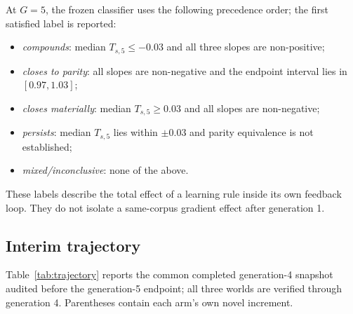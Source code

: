 \documentclass[11pt]{article}
\begin{document}
At $G=5$, the frozen classifier uses the following precedence order; the first satisfied
label is reported:
\begin{itemize}
  \item \emph{compounds}: median $T_{s,5}\leq-0.03$ and all three slopes are non-positive;
  \item \emph{closes to parity}: all slopes are non-negative and the endpoint interval lies
        in $[0.97,1.03]$;
  \item \emph{closes materially}: median $T_{s,5}\geq0.03$ and all slopes are non-negative;
  \item \emph{persists}: median $T_{s,5}$ lies within $\pm0.03$ and parity equivalence is
        not established;
  \item \emph{mixed/inconclusive}: none of the above.
\end{itemize}
These labels describe the total effect of a learning rule inside its own feedback loop.
They do not isolate a same-corpus gradient effect after generation 1.

\subsection{Interim trajectory}
\label{sec:tree-interim}

Table~\ref{tab:trajectory} reports the common completed generation-4 snapshot audited before
the generation-5 endpoint; all three worlds are verified through generation 4.  Parentheses
contain each arm's own novel increment.
\end{document}
